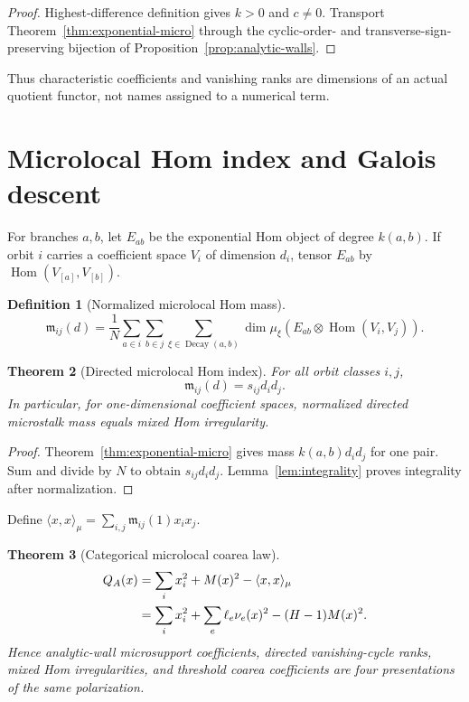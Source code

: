 \documentclass[11pt,a4paper]{amsart}
\theoremstyle{plain}
\newtheorem{theorem}{Theorem}[section]
\theoremstyle{definition}
\newtheorem{definition}[theorem]{Definition}
\newcommand{\Hom}{\operatorname{Hom}}
\begin{document}
\begin{proof}
Highest-difference definition gives $k>0$ and $c\ne0$.  Transport Theorem~\ref{thm:exponential-micro}
through the cyclic-order- and transverse-sign-preserving bijection of
Proposition~\ref{prop:analytic-walls}.
\end{proof}

Thus characteristic coefficients and vanishing ranks are dimensions of an actual quotient
functor, not names assigned to a numerical term.

\section{Microlocal Hom index and Galois descent}\label{sec:microlocal}

For branches $a,b$, let $E_{ab}$ be the exponential Hom object of degree $k(a,b)$.  If orbit $i$
carries a coefficient space $V_i$ of dimension $d_i$, tensor $E_{ab}$ by
$\Hom(V_{[a]},V_{[b]})$.

\begin{definition}[Normalized microlocal Hom mass]\label{def:micro-mass}
\begin{equation}\label{eq:micro-mass}
 \mathfrak m_{ij}(d)=\frac1N
 \sum_{a\in i}\sum_{b\in j}\sum_{\xi\in\operatorname{Decay}(a,b)}
       \dim\mu_\xi(E_{ab}\otimes\Hom(V_i,V_j)).
\end{equation}
\end{definition}

\begin{theorem}[Directed microlocal Hom index]\label{thm:micro-index}
For all orbit classes $i,j$,
\begin{equation}\label{eq:micro-index}
                         \mathfrak m_{ij}(d)=s_{ij}d_id_j.
\end{equation}
In particular, for one-dimensional coefficient spaces, normalized directed microstalk mass equals
mixed Hom irregularity.
\end{theorem}

\begin{proof}
Theorem~\ref{thm:exponential-micro} gives mass $k(a,b)d_id_j$ for one pair.  Sum and divide by
$N$ to obtain $s_{ij}d_id_j$.  Lemma~\ref{lem:integrality} proves integrality after normalization.
\end{proof}

Define $\langle x,x\rangle_\mu=\sum_{i,j}\mathfrak m_{ij}(1)x_ix_j$.

\begin{theorem}[Categorical microlocal coarea law]\label{thm:categorical-coarea}
\begin{align}\label{eq:categorical-coarea}
 Q_A(x)
 &=\sum_i x_i^2+M(x)^2-\langle x,x\rangle_\mu\notag\\
 &=\sum_i x_i^2+\sum_e\ell_e\nu_e(x)^2-(H-1)M(x)^2.
\end{align}
Hence analytic-wall microsupport coefficients, directed vanishing-cycle ranks, mixed Hom irregularities,
and threshold coarea coefficients are four presentations of the same polarization.
\end{theorem}
\end{document}

